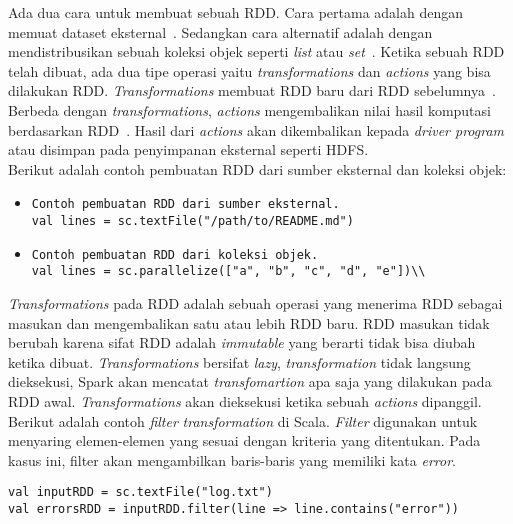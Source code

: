 Ada dua cara untuk membuat sebuah RDD. Cara pertama adalah dengan memuat dataset eksternal~\cite{holdenkarau:07:ls}. Sedangkan cara alternatif adalah dengan mendistribusikan sebuah koleksi objek seperti \textit{list} atau \textit{set}~\cite{holdenkarau:07:ls}. Ketika sebuah RDD telah dibuat, ada dua tipe operasi yaitu \textit{transformations} dan \textit{actions} yang bisa dilakukan RDD. \textit{Transformations} membuat RDD baru dari RDD sebelumnya~\cite{holdenkarau:07:ls}. Berbeda dengan \textit{transformations}, \textit{actions} mengembalikan nilai hasil komputasi berdasarkan RDD~\cite{holdenkarau:07:ls}. Hasil dari \textit{actions} akan dikembalikan kepada \textit{driver program} atau disimpan pada penyimpanan eksternal seperti HDFS. \\

Berikut adalah contoh pembuatan RDD dari sumber eksternal dan koleksi objek:
\begin{itemize}

\item
\begin{verbatim}
Contoh pembuatan RDD dari sumber eksternal.
val lines = sc.textFile("/path/to/README.md")
\end{verbatim}

\item
\begin{verbatim}
Contoh pembuatan RDD dari koleksi objek.
val lines = sc.parallelize(["a", "b", "c", "d", "e"])\\
\end{verbatim}

\end{itemize}


\textit{Transformations} pada RDD adalah sebuah operasi yang menerima RDD sebagai masukan dan mengembalikan satu atau lebih RDD baru. RDD masukan tidak berubah karena sifat RDD adalah \textit{immutable} yang berarti tidak bisa diubah ketika dibuat. \textit{Transformations} bersifat \textit{lazy}, \textit{transformation} tidak langsung dieksekusi, Spark akan mencatat \textit{transfomartion} apa saja yang dilakukan pada RDD awal. \textit{Transformations} akan dieksekusi ketika sebuah \textit{actions} dipanggil.\\

Berikut adalah contoh \textit{filter} \textit{transformation} di Scala. \textit{Filter} digunakan untuk menyaring elemen-elemen yang sesuai dengan kriteria yang ditentukan. Pada kasus ini, filter akan mengambilkan baris-baris yang memiliki kata \textit{error}.
\begin{verbatim}
val inputRDD = sc.textFile("log.txt") 
val errorsRDD = inputRDD.filter(line => line.contains("error"))
\end{verbatim}

